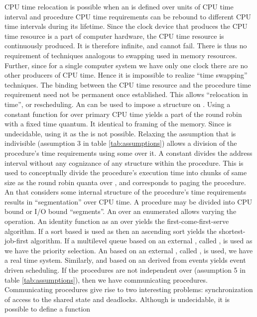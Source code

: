\documentclass[draft]{article}
\begin{document}
CPU time relocation  is possible when an   is defined over units
of  CPU time  interval  and  procedure CPU  time  requirements can  be
rebound to  different CPU time  intervals during its  lifetime.  Since
the clock  device that  produces the  CPU time resource  is a  part of
computer hardware, the CPU time resource is continuously produced.  It
is therefore infinite, and   cannot fail.  There is thus no
requirement  of  techniques  analogous  to  swapping  used  in  memory
resources.  Further, since  for a single computer system  we have only
one  clock there  are no  other producers  of CPU  time.  Hence  it is
impossible  to  realize  ``time  swapping'' techniques.   The  binding
between the CPU time resource  and the procedure time requirement need
not  be  permanent  once  established.  This  allows  ``relocation  in
time'', or rescheduling.   An  can be used  to impose a structure
on .   Using a  constant function for   over primary  CPU time
yields  a part  of the  round  robin with  a fixed  time quantum.   It
identical to  framing of the memory.  Since   is undecidable,
using it as  the  is not possible.   Relaxing the assumption that
 is indivisible (assumption 3 in table \ref{tab:assumptions})
allows  a division  of the  procedure's time  requirements  using some
 over it.  A constant   divides the address interval without
any cognizance of any structure within the procedure.  This is used to
conceptually divide the procedure's execution time into chunks of same
size as the round robin quanta over , and corresponds to paging the
procedure.   An  that  considers some  internal structure  of the
procedure's  time requirements  results in  ``segmentation''  over CPU
time.   A  procedure  may be  divided  into  CPU  bound or  I/O  bound
``segments''.   An   over an  enumerated   allows  varying the
 operation.  An identity function  as an  over  yields
the first-come-first-serve  algorithm.  If  a sort based   is
used  as  then  an ascending  sort yields  the shortest-job-first
algorithm.  If a multilevel queue  based on an external , called
, is used as  we have the priority selection.  An 
based  on an external  , called  , is
used, we  have a real time  system.  Similarly, and   based on an
  derived from events  yields event  driven scheduling.   If the
procedures  are  not  independent  over   (assumption  5  in  table
\ref{tab:assumptions}),   then  we   have   communicating  procedures.
Communicating  procedures  give  rise  to  two  interesting  problems:
synchronization of access to the shared state and deadlocks.  Although
  is  undecidable,  it  is  possible  to  define  a  function
\end{document}
